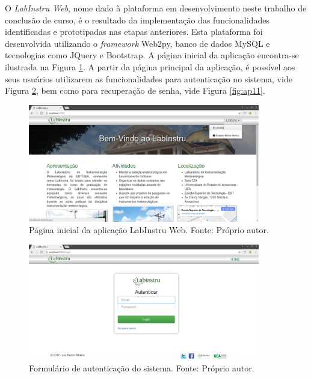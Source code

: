 O \emph{LabInstru Web}, nome dado à plataforma em desenvolvimento neste trabalho de conclusão de curso, é o resultado da implementação das funcionalidades identificadas e prototipadas nas etapas anteriores. Esta plataforma foi desenvolvida utilizando o \emph{framework} Web2py, banco de dados MySQL e tecnologias como JQuery e Bootstrap. A página inicial da aplicação encontra-se ilustrada na Figura \ref{fig:ap1}. A partir da página principal da aplicação, é possível aos seus usuários utilizarem as funcionalidades para autenticação no sistema, vide Figura \ref{fig:ap10}, bem como para recuperação de senha, vide Figura  \ref{fig:ap11}.

\newpage

\begin{figure}[h!]
	\centering
	\includegraphics[width=0.9\textwidth]{./img/ap1.png}
	\caption{Página inicial da aplicação LabInstru Web. Fonte: Próprio autor.} \label{fig:ap1}
\end{figure}

\begin{figure}[h!]
	\centering
	\includegraphics[width=0.9\textwidth]{./img/ap10.png}
	\caption{Formulário de autenticação do sistema. Fonte: Próprio autor.} \label{fig:ap10}
\end{figure}

\newpage

